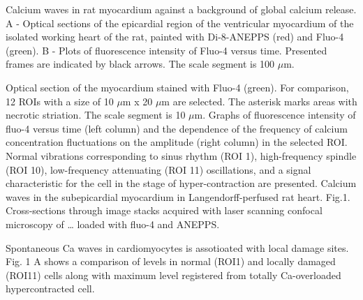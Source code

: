 \documentclass{biophys-new}
\begin{document}
Calcium waves in rat myocardium against a background of global calcium release. A - Optical sections of the epicardial region of the ventricular myocardium of the isolated working heart of the rat, painted with Di-8-ANEPPS (red) and Fluo-4 (green). B - Plots of fluorescence intensity of Fluo-4 versus time. Presented frames are indicated by black arrows. The scale segment is 100 $\mu$m.

Optical section of the myocardium stained with Fluo-4 (green).
For comparison, 12 ROIs with a size of 10 $\mu$m x 20 $\mu$m are selected.
The asterisk marks areas with necrotic striation. The scale segment is 10 $\mu$m.
Graphs of fluorescence intensity of fluo-4 versus time (left column) and the dependence of the frequency of calcium concentration fluctuations on the amplitude (right column) in the selected ROI.
Normal vibrations corresponding to sinus rhythm (ROI 1), high-frequency spindle (ROI 10), low-frequency attenuating (ROI 11) oscillations, and a signal characteristic for the cell in the stage of hyper-contraction are presented.
Calcium waves in the subepicardial myocardium in Langendorff-perfused rat heart. Fig.1. Cross-sections through image stacks acquired with laser scanning confocal microscopy of … loaded with fluo-4 and ANEPPS.


Spontaneous Ca waves in cardiomyocytes is assotioated with local damage sites.
Fig. 1 A shows a comparison of  levels in normal (ROI1) and locally damaged (ROI11) cells along with maximum  level registered from totally Ca-overloaded hypercontracted cell.
\end{document}
